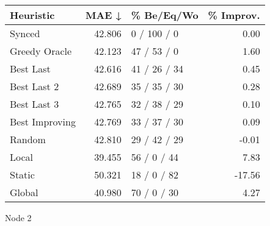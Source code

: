 \begin{tabular}{lrlr}
\toprule
\textbf{Heuristic} & \textbf{MAE ↓} & \textbf{\% Be/Eq/Wo} & \textbf{\% Improv.} \\
\midrule
            Synced &         42.806 &          0 / 100 / 0 &                0.00 \\
     Greedy Oracle &         42.123 &          47 / 53 / 0 &                1.60 \\
         Best Last &         42.616 &         41 / 26 / 34 &                0.45 \\
       Best Last 2 &         42.689 &         35 / 35 / 30 &                0.28 \\
       Best Last 3 &         42.765 &         32 / 38 / 29 &                0.10 \\
    Best Improving &         42.769 &         33 / 37 / 30 &                0.09 \\
            Random &         42.810 &         29 / 42 / 29 &               -0.01 \\
             Local &         39.455 &          56 / 0 / 44 &                7.83 \\
            Static &         50.321 &          18 / 0 / 82 &              -17.56 \\
            Global &         40.980 &          70 / 0 / 30 &                4.27 \\
\bottomrule
\end{tabular}
\caption{Node 2}
\label{tab:iid_lr05_le1_bs4_2}
